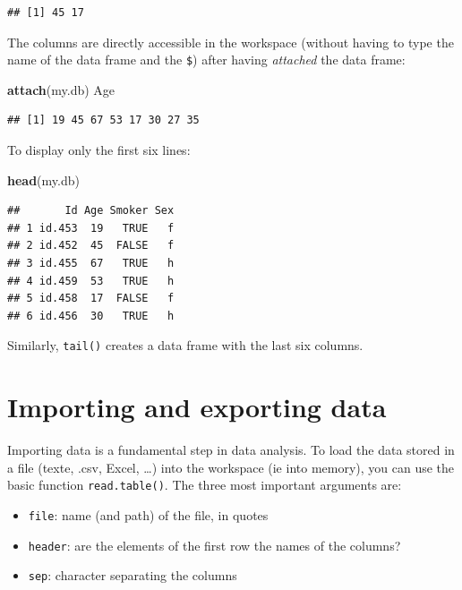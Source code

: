 \documentclass[]{book}
\newenvironment{Shaded}{\begin{snugshade}}{\end{snugshade}}
\newcommand{\KeywordTok}[1]{\textcolor[rgb]{0.13,0.29,0.53}{\textbf{#1}}}
\newcommand{\NormalTok}[1]{#1}
\providecommand{\tightlist}{%
  \setlength{\itemsep}{0pt}\setlength{\parskip}{0pt}}
\begin{document}
\begin{verbatim}
## [1] 45 17
\end{verbatim}

The columns are directly accessible in the workspace (without having to type the name of the data frame and the \texttt{\$}) after having \emph{attached} the data frame:

\begin{Shaded}
\begin{Highlighting}[]
\KeywordTok{attach}\NormalTok{(my.db)}
\NormalTok{Age}
\end{Highlighting}
\end{Shaded}

\begin{verbatim}
## [1] 19 45 67 53 17 30 27 35
\end{verbatim}

To display only the first six lines:

\begin{Shaded}
\begin{Highlighting}[]
\KeywordTok{head}\NormalTok{(my.db)}
\end{Highlighting}
\end{Shaded}

\begin{verbatim}
##       Id Age Smoker Sex
## 1 id.453  19   TRUE   f
## 2 id.452  45  FALSE   f
## 3 id.455  67   TRUE   h
## 4 id.459  53   TRUE   h
## 5 id.458  17  FALSE   f
## 6 id.456  30   TRUE   h
\end{verbatim}

Similarly, \texttt{tail()} creates a data frame with the last six columns.

\hypertarget{importing-and-exporting-data}{%
\section{Importing and exporting data}\label{importing-and-exporting-data}}

Importing data is a fundamental step in data analysis. To load the data stored in a file (texte, .csv, Excel, \ldots{}) into the workspace (ie into memory), you can use the basic function \texttt{read.table()}. The three most important arguments are:

\begin{itemize}
\tightlist
\item
  \texttt{file}: name (and path) of the file, in quotes
\item
  \texttt{header}: are the elements of the first row the names of the columns?
\item
  \texttt{sep}: character separating the columns
\end{itemize}
\end{document}
